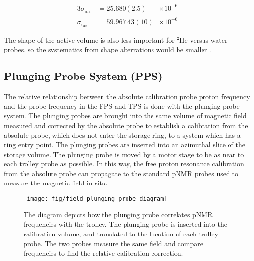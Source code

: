 \begin{alignat}{3}
\sigma_{_{\mathrm{H_2 O}}} & = 25.680(2.5)  & \times 10^{-6} \\
\sigma_{_{\mathrm{^3He}}}  & = 59.967\;43(10) & \times 10^{-6} 
\end{alignat}

\noindent
The shape of the active volume is also less important for $\mathrm{^3He}$ versus water probes, so the systematics from shape aberrations would be smaller \cite{e989-tdr}.

\subsection{Plunging Probe System (PPS)}

The relative relationship between the absolute calibration probe proton frequency and the probe frequency in the FPS and TPS is done with the plunging probe system.  The plunging probes are brought into the same volume of magnetic field measured and corrected by the absolute probe to establish a calibration from the absolute probe, which does not enter the storage ring, to a system which has a ring entry point.  The plunging probes are inserted into an azimuthal slice of the storage volume.  The plunging probe is moved by a motor stage to be as near to each trolley probe as possible.  In this way, the free proton resonance calibration from the absolute probe can propagate to the standard pNMR probes used to measure the \gmtwo magnetic field in situ.

\begin{figure}
\label{fig:field-plunging-probe-diagram}
\texttt{[image: fig/field-plunging-probe-diagram]}
\caption{The diagram depicts how the plunging probe correlates pNMR frequencies with the trolley.  The plunging probe is inserted into the calibration volume, and translated to the location of each trolley probe.  The two probes measure the same field and compare frequencies to find the relative calibration correction.}
\end{figure}

